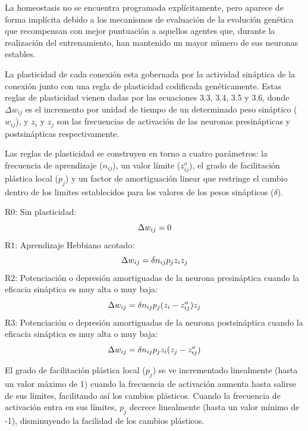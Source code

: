 La homeostasis no se encuentra programada explícitamente, pero aparece de forma implícita debido a los mecanismos de evaluación de la evolución genética que recompensan con mejor puntuación a aquellos
agentes que, durante la realización del entrenamiento, han mantenido un mayor número de sus neuronas estables.

La plasticidad de cada conexión esta gobernada por la actividad sináptica de la conexión junto con una regla de plasticidad codificada genéticamente. Estas reglas de plasticidad vienen dadas por las
ecuaciones 3.3, 3.4, 3.5 y 3.6, donde $\Delta w_{ij}$ es el incremento por unidad de tiempo de un determinado peso sináptico ($w_{ij}$), y $z_{i}$ y $z_{j}$ son las frecuencias de
activación de las neuronas presinápticas y postsinápticas respectivamente.

Las reglas de plasticidad se construyen en torno a cuatro parámetros: la frecuencia de aprendizaje ($n_{ij}$), un valor límite ($z_{ij}^{o}$), el grado de facilitación plástica local ($p_{j}$) y
un factor de amortiguación linear que restringe el cambio dentro de los limites establecidos para los valores de los pesos sinápticos ($\delta$).

\noindent
R0: Sin plasticidad:
\begin{equation} \label{eq:R0plasticityRule}
 \centering
 \Delta w_{ij}= 0
\end{equation}
\noindent
R1: Aprendizaje Hebbiano acotado:
\begin{equation} \label{eq:R1plasticityRule}
 \centering
 \Delta w_{ij}= \delta n_{ij} p_{j} z_{i} z_{j}
\end{equation}
\noindent
R2: Potenciación o depresión amortiguadas de la neurona presináptica cuando la eficacia sináptica es muy alta o muy baja:
\begin{equation} \label{eq:R2plasticityRule}
 \centering
 \Delta w_{ij}= \delta n_{ij} p_{j} (z_{i} - z_{ij}^{o}) z_{j}
\end{equation}
\noindent
R3: Potenciación o depresión amortiguadas de la neurona postsináptica cuando la eficacia sináptica es muy alta o muy baja:
\begin{equation} \label{eq:R3plasticityRule}
 \centering
 \Delta w_{ij}= \delta n_{ij} p_{j} z_{i} (z_{j} - z_{ij}^{o})
\end{equation}

El grado de facilitación plástica local ($p_{j}$) se ve incrementado linealmente (hasta un valor máximo de 1) cuando la frecuencia de activación aumenta hasta salirse de sus límites, facilitando
así los cambios plásticos. Cuando la frecuencia de activación entra en sus límites, $p_{j}$ decrece linealmente (hasta un valor mínimo de -1), disminuyendo la facilidad de los cambios plásticos.

